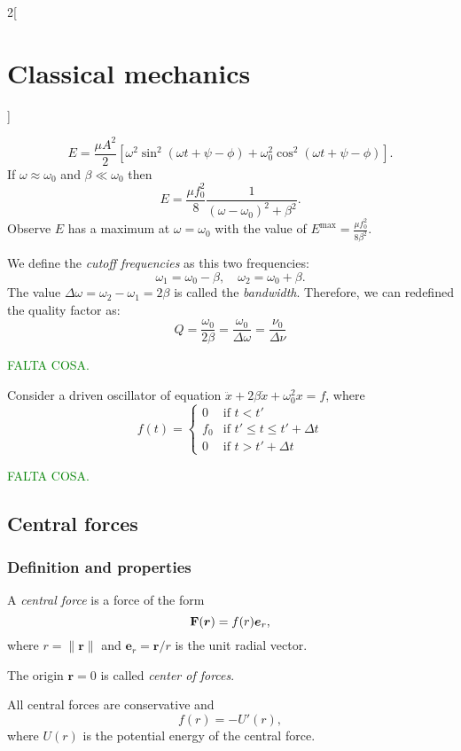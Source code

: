 \documentclass[../../../main.tex]{subfiles}
\begin{document}
\begin{multicols}{2}[\section{Classical mechanics}]
\begin{prop}
    \end{prop}
    \begin{prop}
        $$E=\frac{\mu A^2}{2}\left[\omega^2\sin^2(\omega t+\psi-\phi)+\omega_0^2\cos^2(\omega t+\psi-\phi)\right].$$ If $\omega\approx\omega_0$ and $\beta\ll\omega_0$ then $$E=\frac{\mu f_0^2}{8}\frac{1}{(\omega-\omega_0)^2+\beta^2}.$$ Observe $E$ has a maximum at $\omega=\omega_0$ with the value of $E^\text{max}=\frac{\mu f_0^2}{8\beta^2}$.
    \end{prop}
    \begin{definition}
        We define the \textit{cutoff frequencies} as this two frequencies: $$\omega_1=\omega_0-\beta,\quad\omega_2=\omega_0+\beta.$$ The value  $\Delta\omega=\omega_2-\omega_1=2\beta$ is called the \textit{bandwidth}. Therefore, we can redefined the quality factor as: $$Q=\frac{\omega_0}{2\beta}=\frac{\omega_0}{\Delta\omega}=\frac{\nu_0}{\Delta\nu}$$
    \end{definition}
    \textcolor{green}{FALTA COSA.}
    \begin{prop}
        Consider a driven oscillator of equation $\ddot{x}+2\beta\dot{x}+\omega_0^2x=f$, where $$f(t)=\left\{
            \begin{array}{cc}
                0   & \text{if } t<t'                    \\
                f_0 & \text{if }t'\leq t\leq t'+\Delta t \\
                0   & \text{if } t>t'+\Delta t
            \end{array}\right.$$
    \end{prop}
    \textcolor{green}{FALTA COSA.}
    \subsection{Central forces}
    \subsubsection*{Definition and properties}
    \begin{definition}
        A \textit{central force} is a force of the form $$\boldsymbol{\mathrm{F}}(\boldsymbol{r})=f(r)\boldsymbol{e}_r,$$ where $r=\|\boldsymbol{r}\|$ and $\boldsymbol{e}_r=\boldsymbol{r}/r$ is the unit radial vector.
    \end{definition}
    \begin{definition}
        The origin $\boldsymbol{r}=0$ is called \textit{center of forces}.
    \end{definition}
    \begin{prop}
        All central forces are conservative and $$f(r)=-U'(r),$$ where $U(r)$ is the potential energy of the central force.
    \end{prop}

\end{multicols}
\end{document}
